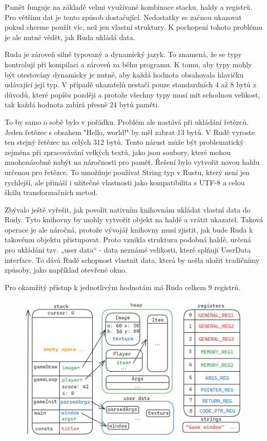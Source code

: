 \documentclass[12pt, a4paper,
twoside,        %
openright
]{report}
\begin{document}
Pamět funguje na základě velmi využívané kombinace stacku, haldy a registrů. Pro většinu dat je tento způsob dostačující. Nedostatky se začnou ukazovat pokud chceme použít víc, než jen vlastní struktury. K pochopení tohoto problému je ale nutné vědět, jak Ruda ukládá data.

Ruda je zároveň silně typovaný a dynamický jazyk. To znamená, že se typy kontrolují při kompilaci a zároveň za běhu programu. K tomu, aby typy mohly být otestovány dynamicky je nutné, aby každá hodnota obsahovala hlavičku udávající její typ. V případě ukazatelů nestačí pouze standardních 4 až 8 bytů z důvodů, které popíšu později a protože všechny typy musí mít schodnou velikost, tak každá hodnota zabírá přesně 24 bytů paměti.

To by samo o sobě bylo v pořádku. Problém ale nastává při ukládání řetězců. Jeden řetězec s obsahem "Hello, world!" by měl zabrat 13 bytů. V Rudě vyroste ten stejný řetězec na celých 312 bytů. Tento nárust může být problematický zejména při zpracovávání velkých textů, jako jsou soubory, které mohou mnohonásobně nabýt na náročnosti pro paměť. Řešení bylo vytvořit novou haldu určenou pro řetězce. To umožňuje používat String typ v Rustu, který není jen rychlejší, ale přináší i užitečné vlastnosti jako kompatibilita s UTF-8 a celou škálu transformačních metod.

Zbývalo ještě vyřešit, jak povolit nativním knihovnám ukládat vlastní data do Rudy. Tyto knihovny by mohly vytvořit objekt na haldě a vrátit ukazatel. Taková operace je ale náročná, protože vývojář knihovny musí zjistit, jak bude Ruda k takovému objektu přistupovat. Proto vznikla struktura podobná haldě, určená pro ukládání tzv. „user data“ - data neznámé velikosti, které splňují UserData interface. To dává Rudě schopnost vlastnit data, která by nešla uložit tradičnímy způsoby, jako například otevřené okno.

Pro okamžitý přístup k jednotlivým hodnotám má Ruda celkem 9 registrů.

\begin{figure}[h]
	\centering
	\includegraphics[width=0.8\linewidth]{image/memory.png}
\end{figure}
\end{document}
